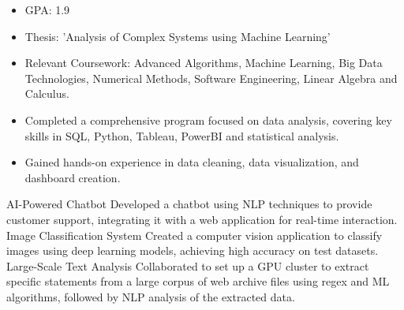 \documentclass[9pt,a4paper,ragged2e,withhyper]{altacv}
\begin{document}
\begin{paracol}{2}
            \begin{itemize}
                \item GPA: 1.9
                \item Thesis: 'Analysis of Complex Systems using Machine Learning'
                \item Relevant Coursework: Advanced Algorithms, Machine Learning, Big Data Technologies, Numerical Methods, Software Engineering, Linear Algebra and Calculus.
            \end{itemize}
            \vspace{0.5em}
            \begin{itemize}
                \item Completed a comprehensive program focused on data analysis, covering key skills in SQL, Python, Tableau, PowerBI and statistical analysis.
                \item Gained hands-on experience in data cleaning, data visualization, and dashboard creation.
            \end{itemize}
            \vspace{0.5em}
        
        \cvevent
            { AI-Powered Chatbot }
            {  }
            {}
            {}
        Developed a chatbot using NLP techniques to provide customer support, integrating it with a web application for real-time interaction.\\
        \vspace{0.5em}
        \cvevent
            { Image Classification System }
            {  }
            {}
            {}
        Created a computer vision application to classify images using deep learning models, achieving high accuracy on test datasets.\\
        \vspace{0.5em}
        \cvevent
            { Large-Scale Text Analysis }
            {  }
            {}
            {}
        Collaborated to set up a GPU cluster to extract specific statements from a large corpus of web archive files using regex and ML algorithms, followed by NLP analysis of the extracted data.\\
        \vspace{0.5em}

        
    \end{paracol}
\end{document}
